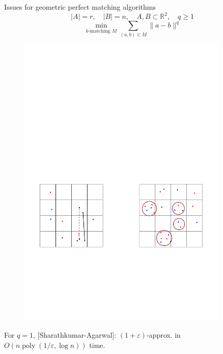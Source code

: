 \documentclass[xcolor={dvipsnames,usenames},handout]{beamer} %
\newcommand{\reals}{\mathbb{R}}
\newcommand{\eps}{\varepsilon}
\DeclareMathOperator{\poly}{poly}
\begin{document}
\begin{frame}{Issues for geometric perfect matching algorithms}
\begin{equation*}
|A| = r, \quad |B| = n, \quad A, B \subset \reals^2, \quad q \geq 1
\end{equation*}
\begin{equation*}
\min_{k \text{-matching } M}\sum_{(a, b) \in M} \|a - b\|^q
\end{equation*}
\vspace{-10pt}
\begin{figure}
\begin{center}
\includegraphics[width=0.9\textwidth,page=1]{perf_geom_issues}%
\end{center}
\end{figure}
\vspace{-5pt}
{\small For $q = 1$, [Sharathkumar-Agarwal]: $(1+\eps)$-approx. in $O(n\poly(1/\eps, \log n))$ time.}
\end{frame}
\end{document}
